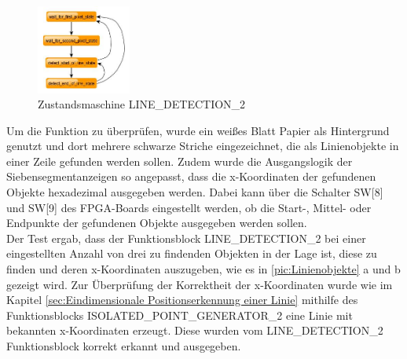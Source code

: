 \documentclass[ngerman,12pt]{article} %
\begin{document}
{\begin{figure}[htbp]
	\begin{center}
	\includegraphics[width = 0.275\textwidth]{LINE_DETECTION_2}
	\caption[Zustandsmaschine LINE\_DETECTION\_2]{\label{pic:Zustandsmaschine LINE_DETECTION_2}Zustandsmaschine LINE\_DETECTION\_2}
	\end{center}
\end{figure}

Um die Funktion zu überprüfen, wurde ein weißes Blatt Papier als Hintergrund genutzt und dort mehrere schwarze Striche eingezeichnet, die als Linienobjekte in einer Zeile gefunden werden sollen. Zudem wurde die Ausgangslogik der Siebensegmentanzeigen so angepasst, dass die x-Koordinaten der gefundenen Objekte hexadezimal ausgegeben werden. Dabei kann über die Schalter SW[8] und SW[9] des FPGA-Boards eingestellt werden, ob die Start-, Mittel- oder Endpunkte der gefundenen Objekte ausgegeben werden sollen.\\
Der Test ergab, dass der Funktionsblock LINE\_DETECTION\_2 bei einer eingestellten Anzahl von drei zu findenden Objekten in der Lage ist, diese zu finden und deren x-Koordinaten auszugeben, wie es in \autoref{pic:Linienobjekte} a und b gezeigt wird. Zur Überprüfung der Korrektheit der x-Koordinaten wurde wie im Kapitel \ref{sec:Eindimensionale Positionserkennung einer Linie} mithilfe des Funktionsblocks ISOLATED\_POINT\_GENERATOR\_2 eine Linie mit bekannten x-Koordinaten erzeugt. Diese wurden vom LINE\_DETECTION\_2 Funktionsblock korrekt erkannt und ausgegeben.

}
\end{document}
